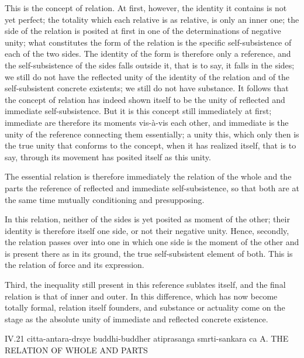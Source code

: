 This is the concept of relation.
At first, however, the identity it contains
is not yet perfect;
the totality which each relative is as relative,
is only an inner one;
the side of the relation is posited at first
in one of the determinations of negative unity;
what constitutes the form of the relation is
the specific self-subsistence of each of the two sides.
The identity of the form is therefore only a reference,
and the self-subsistence of the sides falls outside it,
that is to say, it falls in the sides;
we still do not have the reflected unity
of the identity of the relation
and of the self-subsistent concrete existents;
we still do not have substance.
It follows that the concept of relation has
indeed shown itself to be the unity
of reflected and immediate self-subsistence.
But it is this concept still immediately at first;
immediate are therefore its moments vis-à-vis each other,
and immediate is the unity of the reference
connecting them essentially;
a unity this, which only then is the true unity
that conforms to the concept,
when it has realized itself, that is to say,
through its movement has posited itself as this unity.

The essential relation is therefore immediately
the relation of the whole and the parts
the reference of reflected and immediate self-subsistence,
so that both are at the same time
mutually conditioning and presupposing.

In this relation, neither of the sides is
yet posited as moment of the other;
their identity is therefore itself one side,
or not their negative unity.
Hence, secondly, the relation passes over into one
in which one side is the moment of the other
and is present there as in its ground,
the true self-subsistent element of both.
This is the relation of force and its expression.

Third, the inequality still present
in this reference sublates itself,
and the final relation is that of inner and outer.
In this difference,
which has now become totally formal,
relation itself founders,
and substance or actuality come on the stage
as the absolute unity of
immediate and reflected concrete existence.

IV.21
citta-antara-drsye buddhi-buddher atiprasanga smrti-sankara ca
A. THE RELATION OF WHOLE AND PARTS

